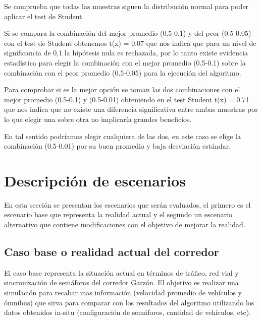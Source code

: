 Se comprueba que todas las muestras siguen la distribución normal para poder aplicar el test de Student. 

%
%

Si se compara la combinación del mejor promedio (0.5-0.1) y del peor (0.5-0.05) con el test de Student obtenemos t(x) = 0.07 que nos indica que para un nivel de significancia de  0,1 la hipótesis nula es rechazada, por lo tanto existe evidencia estadística para elegir la combinación con el mejor promedio (0.5-0.1) sobre la combinación con el peor promedio (0.5-0.05) para la ejecución del algoritmo.

Para comprobar si es la mejor opción  se toman las dos combinaciones con el mejor promedio (0.5-0.1) y (0.5-0.01) obteniendo en el test Student t(x) = 0.71 que nos indica que no existe una diferencia significativa entre ambas muestras por lo que elegir una sobre otra no implicaría grandes beneficios.

En tal sentido podríamos elegir cualquiera de las dos, en este caso se elige  la combinación (0.5-0.01) por su buen promedio y baja desviación estándar.



\section{Descripción de escenarios}
En esta sección se presentan los escenarios que serán evaluados, el primero es el escenario base que representa la realidad actual y el segundo un escenario alternativo que contiene modificaciones con el objetivo de mejorar la realidad.

\subsection{Caso base o realidad actual del corredor}
El caso base representa la situación actual en términos de tráfico, red vial y sincronización de semáforos del corredor Garzón. El objetivo es realizar una simulación para recabar mas información (velocidad promedio de vehículos y ómnibus) que sirva para comparar con los resultados del algoritmo utilizando los datos obtenidos in-situ (configuración de semáforos, cantidad de vehículos, etc). 

